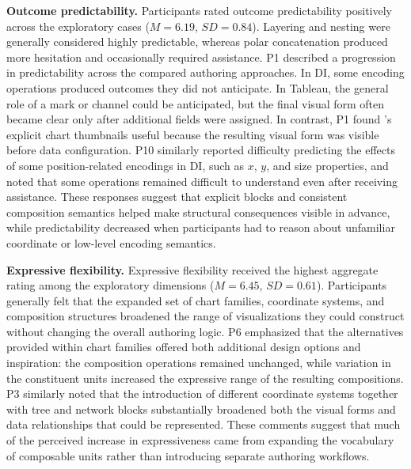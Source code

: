 \textbf{Outcome predictability.}
Participants rated outcome predictability positively across the exploratory
cases ($M=6.19$, $SD=0.84$). Layering and nesting were generally considered
highly predictable, whereas polar concatenation produced more hesitation and
occasionally required assistance.
P1 described a progression in predictability across the compared authoring
approaches. In DI, some encoding operations produced outcomes
they did not anticipate. In Tableau, the general role of a mark or channel
could be anticipated, but the final visual form often became clear only after
additional fields were assigned. In contrast, P1 found {\system}'s explicit
chart thumbnails useful because the resulting visual form was visible before
data configuration. P10 similarly reported difficulty predicting the effects
of some position-related encodings in DI, such as $x$, $y$, and
size properties, and noted that some operations remained difficult to
understand even after receiving assistance.
These responses suggest that explicit blocks and consistent composition
semantics helped make structural consequences visible in advance, while
predictability decreased when participants had to reason about unfamiliar
coordinate or low-level encoding semantics.

\textbf{Expressive flexibility.}
Expressive flexibility received the highest aggregate rating among the
exploratory dimensions ($M=6.45$, $SD=0.61$). Participants generally felt that
the expanded set of chart families, coordinate systems, and composition
structures broadened the range of visualizations they could construct without
changing the overall authoring logic.
P6 emphasized that the alternatives provided within chart families offered
both additional design options and inspiration: the composition operations
remained unchanged, while variation in the constituent units increased the
expressive range of the resulting compositions. P3 similarly noted that the
introduction of different coordinate systems together with tree and network
blocks substantially broadened both the visual forms and data relationships
that could be represented. These comments suggest that much of the perceived
increase in expressiveness came from expanding the vocabulary of composable
units rather than introducing separate authoring workflows.
